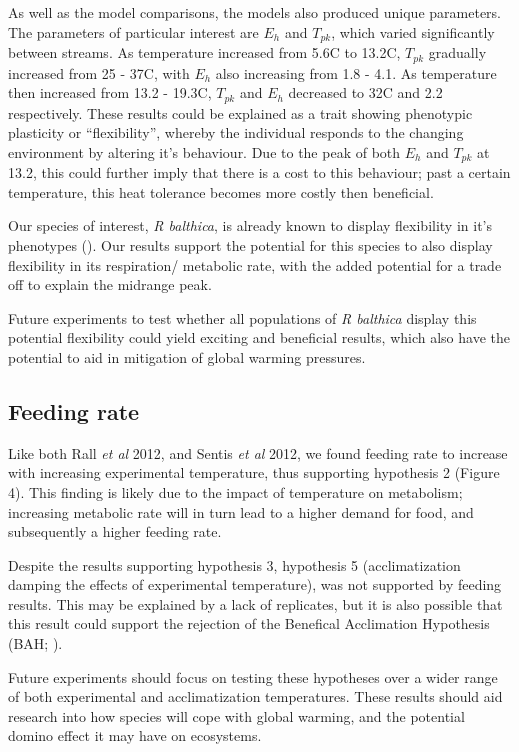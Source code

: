 \documentclass[../../Paper.tex]{subfiles}
\begin{document}
As well as the model comparisons, the models also produced unique parameters. The parameters of particular
interest are $E_h$ and $T_{pk}$, which varied significantly between streams. As temperature increased
from 5.6\degree C to 13.2\degree C, $T_{pk}$ gradually increased from 25 - 37\degree C, with $E_h$ also increasing
from 1.8 - 4.1. As temperature then increased from 13.2 - 19.3\degree C, $T_{pk}$ and $E_h$ decreased to 32\degree C
and 2.2 respectively. These results could be explained as a trait showing phenotypic plasticity or ``flexibility'',
whereby the individual responds to the changing environment by altering it's behaviour. Due to the peak of both $E_h$
and $T_{pk}$ at 13.2, this could further imply that there is a cost to this behaviour; past a certain 
temperature, this heat tolerance becomes more costly then beneficial.

Our species of interest, \textit{R balthica}, is already known to display flexibility in it's 
phenotypes (\cite{ahlgren_camouflaged_2013}). Our results support the potential for this species
to also display flexibility in its respiration/ metabolic rate, with the added potential for a trade 
off to explain the midrange peak. 

Future experiments to test whether all populations of \textit{R balthica} display this potential flexibility
could yield exciting and beneficial results, which also have the potential to aid in mitigation of global warming
pressures. 

\subsection*{Feeding rate}

Like both Rall \textit{et al} 2012, and Sentis \textit{et al} 2012, we found feeding rate to increase with
increasing experimental temperature, thus supporting hypothesis 2 (Figure 4). This finding is likely due to the
impact of temperature on metabolism; increasing metabolic rate will in turn lead to a higher demand for food, and 
subsequently a higher feeding rate. 

Despite the results supporting hypothesis 3, hypothesis 5 (acclimatization damping the effects of experimental temperature), was not 
supported by feeding results. This may be explained by a lack of replicates, but it is also possible that this result could 
support the rejection of the Benefical Acclimation Hypothesis (BAH; \cite{leroi_temperature_1994}).

Future experiments should focus on testing these hypotheses over a wider range of both experimental and acclimatization 
temperatures. These results should aid research into how species will cope with global warming, and the 
potential domino effect it may have on ecosystems. 
\end{document}
